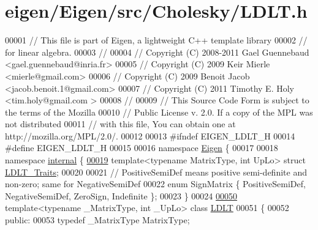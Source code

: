 \hypertarget{eigen_2_eigen_2src_2_cholesky_2_l_d_l_t_8h_source}{}\section{eigen/\+Eigen/src/\+Cholesky/\+L\+D\+LT.h}
\label{eigen_2_eigen_2src_2_cholesky_2_l_d_l_t_8h_source}

\begin{DoxyCode}
00001 \textcolor{comment}{// This file is part of Eigen, a lightweight C++ template library}
00002 \textcolor{comment}{// for linear algebra.}
00003 \textcolor{comment}{//}
00004 \textcolor{comment}{// Copyright (C) 2008-2011 Gael Guennebaud <gael.guennebaud@inria.fr>}
00005 \textcolor{comment}{// Copyright (C) 2009 Keir Mierle <mierle@gmail.com>}
00006 \textcolor{comment}{// Copyright (C) 2009 Benoit Jacob <jacob.benoit.1@gmail.com>}
00007 \textcolor{comment}{// Copyright (C) 2011 Timothy E. Holy <tim.holy@gmail.com >}
00008 \textcolor{comment}{//}
00009 \textcolor{comment}{// This Source Code Form is subject to the terms of the Mozilla}
00010 \textcolor{comment}{// Public License v. 2.0. If a copy of the MPL was not distributed}
00011 \textcolor{comment}{// with this file, You can obtain one at http://mozilla.org/MPL/2.0/.}
00012 
00013 \textcolor{preprocessor}{#ifndef EIGEN\_LDLT\_H}
00014 \textcolor{preprocessor}{#define EIGEN\_LDLT\_H}
00015 
00016 \textcolor{keyword}{namespace }\hyperlink{namespace_eigen}{Eigen} \{
00017 
00018 \textcolor{keyword}{namespace }\hyperlink{namespaceinternal}{internal} \{
\hyperlink{struct_eigen_1_1internal_1_1_l_d_l_t___traits}{00019}   \textcolor{keyword}{template}<\textcolor{keyword}{typename} MatrixType, \textcolor{keywordtype}{int} UpLo> \textcolor{keyword}{struct }\hyperlink{struct_eigen_1_1internal_1_1_l_d_l_t___traits}{LDLT\_Traits};
00020 
00021   \textcolor{comment}{// PositiveSemiDef means positive semi-definite and non-zero; same for NegativeSemiDef}
00022   \textcolor{keyword}{enum} SignMatrix \{ PositiveSemiDef, NegativeSemiDef, ZeroSign, Indefinite \};
00023 \}
00024 
\hyperlink{group___cholesky___module}{00050} \textcolor{keyword}{template}<\textcolor{keyword}{typename} \_MatrixType, \textcolor{keywordtype}{int} \_UpLo> \textcolor{keyword}{class }\hyperlink{group___cholesky___module_class_eigen_1_1_l_d_l_t}{LDLT}
00051 \{
00052   \textcolor{keyword}{public}:
00053     \textcolor{keyword}{typedef} \_MatrixType MatrixType;

\end{DoxyCode}
